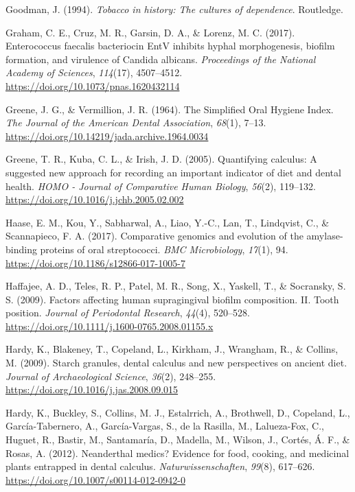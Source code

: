 \documentclass[
  letterpaper,
]{book}
\newlength{\cslhangindent}
\newlength{\cslentryspacingunit} %
\newenvironment{CSLReferences}[2] %
 {%
  \setlength{\parindent}{0pt}
  \ifodd #1
  \let\oldpar\par
  \def\par{\hangindent=\cslhangindent\oldpar}
  \fi
  \setlength{\parskip}{#2\cslentryspacingunit}
 }%
 {}
\begin{document}
\begin{CSLReferences}{1}{0}
\leavevmode{}%
Goodman, J. (1994). \emph{Tobacco in history: The cultures of
dependence}. {Routledge}.

\leavevmode{}%
Graham, C. E., Cruz, M. R., Garsin, D. A., \& Lorenz, M. C. (2017).
Enterococcus faecalis bacteriocin {EntV} inhibits hyphal morphogenesis,
biofilm formation, and virulence of {Candida} albicans.
\emph{Proceedings of the National Academy of Sciences}, \emph{114}(17),
4507--4512. \url{https://doi.org/10.1073/pnas.1620432114}

\leavevmode{}%
Greene, J. G., \& Vermillion, J. R. (1964). The {Simplified Oral Hygiene
Index}. \emph{The Journal of the American Dental Association},
\emph{68}(1), 7--13.
\url{https://doi.org/10.14219/jada.archive.1964.0034}

\leavevmode{}%
Greene, T. R., Kuba, C. L., \& Irish, J. D. (2005). Quantifying
calculus: {A} suggested new approach for recording an important
indicator of diet and dental health. \emph{HOMO - Journal of Comparative
Human Biology}, \emph{56}(2), 119--132.
\url{https://doi.org/10.1016/j.jchb.2005.02.002}

\leavevmode{}%
Haase, E. M., Kou, Y., Sabharwal, A., Liao, Y.-C., Lan, T., Lindqvist,
C., \& Scannapieco, F. A. (2017). Comparative genomics and evolution of
the amylase-binding proteins of oral streptococci. \emph{BMC
Microbiology}, \emph{17}(1), 94.
\url{https://doi.org/10.1186/s12866-017-1005-7}

\leavevmode{}%
Haffajee, A. D., Teles, R. P., Patel, M. R., Song, X., Yaskell, T., \&
Socransky, S. S. (2009). Factors affecting human supragingival biofilm
composition. {II}. {Tooth} position. \emph{Journal of Periodontal
Research}, \emph{44}(4), 520--528.
\url{https://doi.org/10.1111/j.1600-0765.2008.01155.x}

\leavevmode{}%
Hardy, K., Blakeney, T., Copeland, L., Kirkham, J., Wrangham, R., \&
Collins, M. (2009). Starch granules, dental calculus and new
perspectives on ancient diet. \emph{Journal of Archaeological Science},
\emph{36}(2), 248--255. \url{https://doi.org/10.1016/j.jas.2008.09.015}

\leavevmode{}%
Hardy, K., Buckley, S., Collins, M. J., Estalrrich, A., Brothwell, D.,
Copeland, L., García-Tabernero, A., García-Vargas, S., de la Rasilla,
M., Lalueza-Fox, C., Huguet, R., Bastir, M., Santamaría, D., Madella,
M., Wilson, J., Cortés, Á. F., \& Rosas, A. (2012). Neanderthal medics?
{Evidence} for food, cooking, and medicinal plants entrapped in dental
calculus. \emph{Naturwissenschaften}, \emph{99}(8), 617--626.
\url{https://doi.org/10.1007/s00114-012-0942-0}


\end{CSLReferences}
\end{document}
